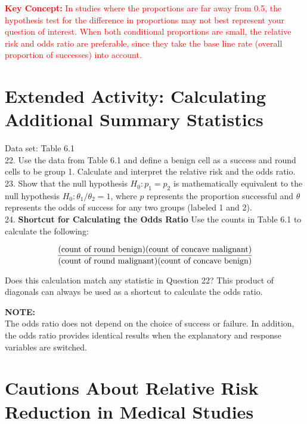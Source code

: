 \documentclass[
]{report}
\begin{document}
\Large

\textbf{\textcolor{red}{Key Concept:}}
\textcolor{red}{In studies where the proportions are far away from 0.5, the hypothesis test for the difference in proportions may not best represent your question of interest. When both conditional proportions are small, the relative risk and odds ratio are preferable, since they take the base line rate (overall proportion of successes) into account.}
\normalsize

\section*{Extended Activity: Calculating Additional Summary Statistics}\label{extended-activity-calculating-additional-summary-statistics}

Data set: Table 6.1\\
22. Use the data from Table 6.1 and define a benign cell as a success and round cells to be group 1. Calculate and interpret the relative risk and the odds ratio.\\
23. Show that the null hypothesis \(H_0: p_1 = p_2\) is mathematically equivalent to the null hypothesis \(H_0: \theta_1/\theta_2 = 1\), where \(p\) represents the proportion successful and \(\theta\) represents the odds of success for any two groups (labeled 1 and 2).\\
24. \textbf{Shortcut for Calculating the Odds Ratio} Use the counts in Table 6.1 to calculate the following:

\begin{align}
\frac{\text{(count of round benign)(count of concave malignant)}}{\text{(count of round malignant)(count of concave benign)}}
\notag
\end{align}

Does this calculation match any statistic in Question 22? This product of diagonals can always be used as a shortcut to calculate the odds ratio.

\large

\textbf{NOTE:}\\
The odds ratio does not depend on the choice of success or failure. In addition, the odds ratio provides identical results when the explanatory and response variables are switched.\\
\normalsize

\section*{Cautions About Relative Risk Reduction in Medical Studies}\label{cautions-about-relative-risk-reduction-in-medical-studies}
\end{document}
